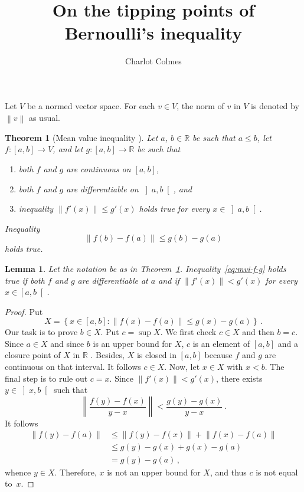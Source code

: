 \documentclass[12pt]{article}
\newcommand{\bR}{\mathbb{R}}
\newcommand{\norm}[1]{\left\| #1 \right\|}
\newtheorem{theorem}{Theorem}
\newtheorem{lemma}{Lemma}
\begin{document}
\title{On the tipping points of Bernoulli's inequality}
\author{Charlot Colmes}
\maketitle 

\sloppy

Let $V$ be a normed vector space.
For each $v \in V$, the norm of $v$ in $V$ is denoted by $\norm{v}$ as usual.

\begin{theorem}[Mean value inequality \cite{Coleman-calculus}] \label{thm:mvi}
  Let $a$, $b \in \bR$ be such that $a \le b$,
  let $f\colon [a, b] \to V$, and let $g\colon [a, b] \to \bR$ be such that
  \begin{enumerate}
  \item both $f$ and $g$ are continuous on $[a, b]$,
  \item both $f$ and $g$ are differentiable on $\left]a, b \right[$, and
  \item inequality $\norm{f'(x)} \le g'(x)$ holds true for every $x \in \left]a, b \right[$.
  \end{enumerate}
  Inequality
  \begin{equation} \label{eq:mvi-f-g}
    \norm{f(b) - f(a)} \le g(b) - g(a) 
  \end{equation} 
  holds true.
\end{theorem}

\begin{lemma} \label{lem:mvi}
  Let the notation be as in Theorem~\ref{thm:mvi}.
  Inequality~\eqref{eq:mvi-f-g} holds true
  if both $f$ and $g$ are differentiable at $a$
  and
  if $\norm{f'(x)} < g'(x)$ for every $x \in \left[a, b \right[$.  
\end{lemma}

\begin{proof}
  Put
  $$
  X = \left\{ x \in [a, b] : \norm{f(x) - f(a)}  \le g(x) - g(a) \right\} \, .
  $$
  Our task is to prove $b \in X$.
  Put $c = \sup X$.  %
  We first check $c \in X$ and then $b = c$.
  Since $a \in X$ and since $b$ is an upper bound for $X$,
  $c$ is
  an element of $[a, b]$
  and
  a closure point of $X$ in $\bR$ \cite{RudinPrinciples}.
  Besides, $X$ is closed in $[a, b]$ because $f$ and $g$ are continuous on that interval.
  It follows $c \in X$.
  Now, let $x \in X$ with $x < b$.
  The final step is to rule out $c = x$.
  Since $\norm{f'(x)} < g'(x)$,
  there exists $y \in \left]x, b\right[$ such that
  $$
  \norm{\frac{f(y)  - f(x)}{y - x}} < \frac{g(y) - g(x)}{y - x}  \, .
  $$
  It follows 
  \begin{align*}
    \norm{f(y) - f(a)}
    & \le \norm{f(y) - f(x)} + \norm{f(x) - f(a)} \\
    & \le g(y) - g(x) + g(x) - g(a)   \\
    & = g(y) - g(a)  \,, 
  \end{align*}
  whence $y \in X$.
  Therefore, $x$ is not an upper bound for $X$, and thus $c$ is not equal to~$x$.
\end{proof}
\end{document}
